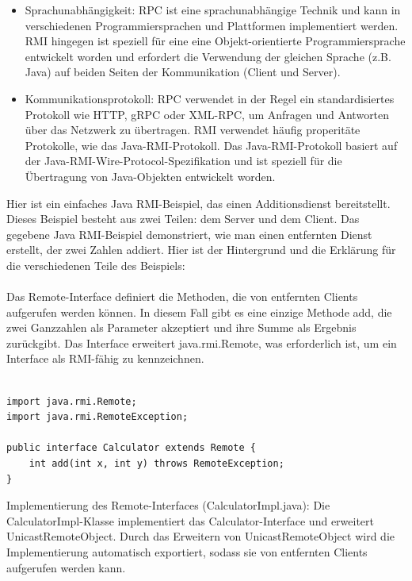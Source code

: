 \documentclass[../vs-script-first-v01.tex]{subfiles}
\begin{document}
\begin{itemize} 
\item Sprachunabhängigkeit: RPC ist eine sprachunabhängige Technik und kann in verschiedenen Programmiersprachen und Plattformen implementiert werden. RMI hingegen ist speziell für eine eine Objekt-orientierte Programmiersprache entwickelt worden und erfordert die Verwendung der gleichen Sprache (z.B. Java) auf beiden Seiten der Kommunikation (Client und Server).
\item Kommunikationsprotokoll: RPC verwendet in der Regel ein standardisiertes Protokoll wie HTTP, gRPC oder XML-RPC, um Anfragen und Antworten über das Netzwerk zu übertragen. RMI verwendet häufig properitäte Protokolle, wie das Java-RMI-Protokoll. Das Java-RMI-Protokoll basiert auf der Java-RMI-Wire-Protocol-Spezifikation  und ist speziell für die Übertragung von Java-Objekten entwickelt worden.
\end{itemize} 
Hier ist ein einfaches Java RMI-Beispiel, das einen Additionsdienst bereitstellt. Dieses Beispiel besteht aus zwei Teilen: dem Server und dem Client. Das gegebene Java RMI-Beispiel demonstriert, wie man einen  entfernten Dienst erstellt, der zwei Zahlen addiert. Hier ist der Hintergrund und die Erklärung für die verschiedenen Teile des Beispiels:
\\\\
Das Remote-Interface definiert die Methoden, die von entfernten Clients aufgerufen werden können. In diesem Fall gibt es eine einzige Methode add, die zwei Ganzzahlen als Parameter akzeptiert und ihre Summe als Ergebnis zurückgibt. Das Interface erweitert java.rmi.Remote, was erforderlich ist, um ein Interface als RMI-fähig zu kennzeichnen.\\\\

\noindent\begin{minipage}{\textwidth}
\begin{lstlisting}[caption={Remote-Interface (Calculator.java)},captionpos=b,label={lst:rmi-serverI}]
import java.rmi.Remote;
import java.rmi.RemoteException;

public interface Calculator extends Remote {
    int add(int x, int y) throws RemoteException;
}
\end{lstlisting}
\end{minipage}
Implementierung des Remote-Interfaces (CalculatorImpl.java):
Die CalculatorImpl-Klasse implementiert das Calculator-Interface und erweitert UnicastRemoteObject. Durch das Erweitern von UnicastRemoteObject wird die Implementierung automatisch exportiert, sodass sie von entfernten Clients aufgerufen werden kann.\\\\
\end{document}
